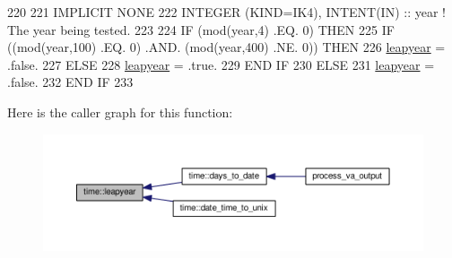 \begin{DoxyCode}
220 
221 \textcolor{keywordtype}{IMPLICIT NONE}
222 \textcolor{keywordtype}{INTEGER (KIND=IK4)}, \textcolor{keywordtype}{INTENT(IN)}                          :: year         \textcolor{comment}{! The year being tested.}
223 
224 \textcolor{keywordflow}{IF} (mod(year,4) .EQ. 0) \textcolor{keywordflow}{THEN}
225     \textcolor{keywordflow}{IF} ((mod(year,100) .EQ. 0) .AND. (mod(year,400) .NE. 0)) \textcolor{keywordflow}{THEN}
226         \hyperlink{namespacetime_ac7f82d40fd2b49e7e9025b103e88555c}{leapyear}    = .false.
227     \textcolor{keywordflow}{ELSE}
228         \hyperlink{namespacetime_ac7f82d40fd2b49e7e9025b103e88555c}{leapyear}    = .true.
229 \textcolor{keywordflow}{    END IF}
230 \textcolor{keywordflow}{ELSE}
231     \hyperlink{namespacetime_ac7f82d40fd2b49e7e9025b103e88555c}{leapyear}        = .false.
232 \textcolor{keywordflow}{END IF}
233 
\end{DoxyCode}


Here is the caller graph for this function\+:\nopagebreak
\begin{figure}[H]
\begin{center}
\leavevmode
\includegraphics[width=350pt]{namespacetime_ac7f82d40fd2b49e7e9025b103e88555c_icgraph}
\end{center}
\end{figure}


